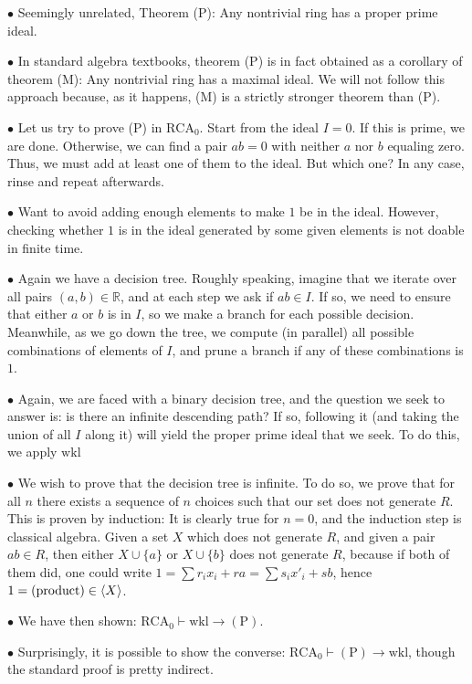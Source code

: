 \documentclass{article}
\theoremstyle{nonumberplain}
\newcommand{\R}{\mathbb{R}}
\newcommand{\RCA}{\mathrm{RCA}}
\newcommand{\wkl}{\mathrm{wkl}}
\DeclarePairedDelimiter{\braket}{\langle}{\rangle}
\newcommand\point[1]{\noindent \hspace{\labelsep} $\bullet$ #1 \smallskip}
\newcommand\thname[1]{\mathrm{(#1)}}
\begin{document}
\point{Seemingly unrelated, Theorem (P): Any nontrivial ring has a proper prime ideal.}

\point{In standard algebra textbooks, theorem (P) is in fact obtained as a corollary of theorem (M): Any nontrivial ring has a maximal ideal. We will not follow this approach because, as it happens, (M) is a strictly stronger theorem than (P).}

\point{Let us try to prove (P) in $\RCA_0$. Start from the ideal $I = 0$. If this is prime, we are done. Otherwise, we can find a pair $ab = 0$ with neither $a$ nor $b$ equaling zero. Thus, we must add at least one of them to the ideal. But which one? In any case, rinse and repeat afterwards.}

\point{Want to avoid adding enough elements to make $1$ be in the ideal. However, checking whether $1$ is in the ideal generated by some given elements is not doable in finite time.}

\point{Again we have a decision tree. Roughly speaking, imagine that we iterate over all pairs $(a,b) \in \R$, and at each step we ask if $ab \in I$. If so, we need to ensure that either $a$ or $b$ is in $I$, so we make a branch for each possible decision. Meanwhile, as we go down the tree, we compute (in parallel) all possible combinations of elements of $I$, and prune a branch if any of these combinations is $1$.}

\point{Again, we are faced with a binary decision tree, and the question we seek to answer is: is there an infinite descending path? If so, following it (and taking the union of all $I$ along it) will yield the proper prime ideal that we seek. To do this, we apply $\wkl$}

\point{We wish to prove that the decision tree is infinite. To do so, we prove that for all $n$ there exists a sequence of $n$ choices such that our set does not generate $R$. This is proven by induction: It is clearly true for $n = 0$, and the induction step is classical algebra. Given a set $X$ which does not generate $R$, and given a pair $ab \in R$, then either $X \cup \{a\}$ or $X \cup \{b\}$ does not generate $R$, because if both of them did, one could write $1 = \sum r_i x_i  + r a = \sum s_i x'_i + s b$, hence $1 = \text{(product)} \in \braket{X}$.}

\point{We have then shown: $\RCA_0 \vdash \wkl \rightarrow \thname P$.}

\point{Surprisingly, it is possible to show the converse: $\RCA_0 \vdash \thname P \rightarrow \wkl$, though the standard proof is pretty indirect.}
\end{document}
